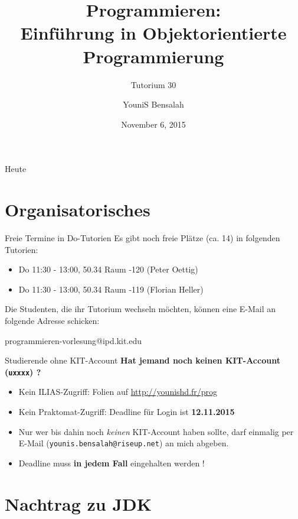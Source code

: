 \documentclass[18pt]{beamer}
\title[Einführung in Objektorientierte Programmierung]{Programmieren:\\ Einführung in Objektorientierte Programmierung}
\subtitle{Tutorium 30}
\author{YouniS Bensalah}
\date{November 6, 2015}
\institute{Chair for Software Design and Quality}
\begin{document}

\begin{frame}
\titlepage
\end{frame}

\begin{frame}{Heute}
\tableofcontents
\end{frame}

\section{Organisatorisches}

\begin{frame}{Freie Termine in Do-Tutorien}
    Es gibt noch freie Plätze (ca. 14) in folgenden Tutorien:
    \begin{itemize}
        \item Do 11:30 - 13:00, 50.34 Raum -120 (Peter Oettig)
        \item Do 11:30 - 13:00, 50.34 Raum -119 (Florian Heller)
    \end{itemize}
    Die Studenten, die ihr Tutorium wechseln möchten, können eine E-Mail an folgende Adresse schicken:\\
    \begin{center}
    {\Large programmieren-vorlesung@ipd.kit.edu}
    \end{center}
\end{frame}

\begin{frame}{Studierende ohne KIT-Account}
    \textbf{Hat jemand noch keinen KIT-Account (\texttt{uxxxx}) ?}
    \pause
    \begin{itemize}
        \item Kein ILIAS-Zugriff: Folien auf \url{http://younishd.fr/prog}
        \item \alert{Kein Praktomat-Zugriff: Deadline für Login ist \textbf{12.11.2015}}
        \item Nur wer bis dahin noch \textit{keinen} KIT-Account haben sollte, darf einmalig per E-Mail (\texttt{younis.bensalah@riseup.net}) an mich abgeben.
        \item Deadline muss \textbf{in jedem Fall} eingehalten werden !
    \end{itemize}
\end{frame}

\section{Nachtrag zu JDK}
\end{document}
